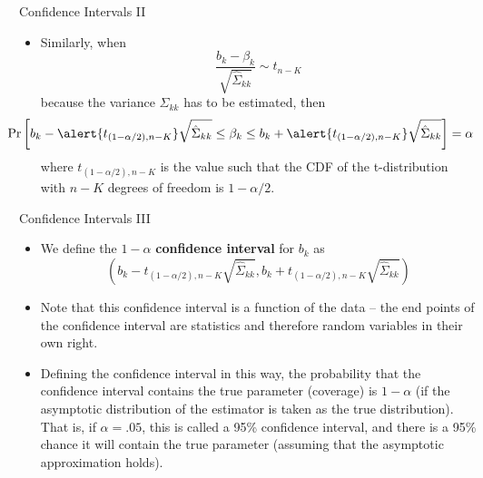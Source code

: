 \begin{frame}{Confidence Intervals II}
\begin{itemize}
	\item Similarly, when \[
		\frac{b_k - \beta_k}{\sqrt{\hat{\Sigma}_{kk}}} \sim t_{n-K}
	\]
	because the variance $\Sigma_{kk}$ has to be estimated, then
 \[
	\hspace*{-1cm} \Pr\left[ b_{k} - \alert{t_{\left(1-\alpha/2\right),n-K}} \sqrt{\hat{\Sigma}_{kk}} \le \beta_k
	 \le b_k +  \alert{t_{\left(1-\alpha/2\right),n-K}}  \sqrt{\hat{\Sigma}_{kk}}  \right] =\alpha 
	\]
	where $ t_{\left(1-\alpha/2\right),n-K} $ is the value such that the CDF of the t-distribution with $n-K$ degrees of freedom is $1-\alpha/2$. 	

\end{itemize}
\end{frame}



\begin{frame}{Confidence Intervals III}
\begin{itemize}
	\item We define the $1-\alpha$ {\bf confidence interval} for $b_{k}$ as \[
	\left(b_{k} - t_{\left(1-\alpha/2\right),n-K} \sqrt{\hat{\Sigma}_{kk}} , b_k +  t_{\left(1-\alpha/2\right),n-K}  \sqrt{\hat{\Sigma}_{kk}} \right)
	\]

	\smallskip
	\item Note that this confidence interval is a function of the data -- the end points of the confidence interval 
	are statistics and therefore random variables in their own right. 

	\smallskip
	\item Defining the confidence interval in this way, the probability that the confidence interval contains
	the true parameter (\alert{coverage}) is $1-\alpha$ (if the asymptotic distribution of the estimator is taken as the true distribution). 
	That is, if $\alpha=.05$, this is called a 95\% confidence interval, and there
	is a 95\% chance it will contain the true parameter (assuming that the asymptotic approximation holds). 

\end{itemize}
\end{frame}


